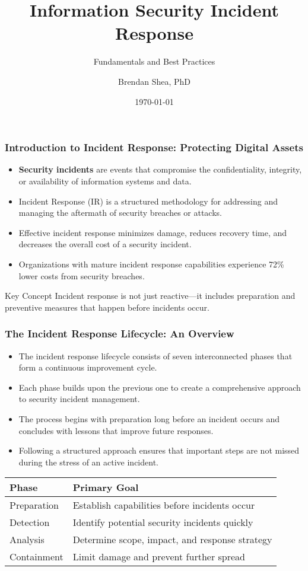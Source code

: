 \documentclass{beamer}
\title{Information Security Incident Response}
\subtitle{Fundamentals and Best Practices}
\author{Brendan Shea, PhD}
\institute{Department of Computer Science}
\date{\today}
\begin{document}
\begin{frame}
\titlepage
\end{frame}

\begin{frame}
\frametitle{Introduction to Incident Response: Protecting Digital Assets}
\begin{itemize}
\item \textbf{Security incidents} are events that compromise the confidentiality, integrity, or availability of information systems and data.
\item Incident Response (IR) is a structured methodology for addressing and managing the aftermath of security breaches or attacks.
\item Effective incident response minimizes damage, reduces recovery time, and decreases the overall cost of a security incident.
\item Organizations with mature incident response capabilities experience 72\% lower costs from security breaches.
\end{itemize}

\begin{alertblock}{Key Concept}
Incident response is not just reactive—it includes preparation and preventive measures that happen before incidents occur.
\end{alertblock}
\end{frame}

\begin{frame}
\frametitle{The Incident Response Lifecycle: An Overview}
\begin{itemize}
\item The incident response lifecycle consists of seven interconnected phases that form a continuous improvement cycle.
\item Each phase builds upon the previous one to create a comprehensive approach to security incident management.
\item The process begins with preparation long before an incident occurs and concludes with lessons that improve future responses.
\item Following a structured approach ensures that important steps are not missed during the stress of an active incident.
\end{itemize}

\begin{center}
\begin{tabular}{|l|l|}
\hline
\textbf{Phase} & \textbf{Primary Goal} \\
\hline
Preparation & Establish capabilities before incidents occur \\
Detection & Identify potential security incidents quickly \\
Analysis & Determine scope, impact, and response strategy \\
Containment & Limit damage and prevent further spread \\
\hline
\end{tabular}
\end{center}
\end{frame}
\end{document}
